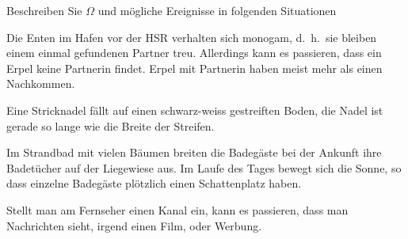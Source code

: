 Beschreiben Sie $\Omega$ und mögliche Ereignisse in folgenden Situationen
\begin{teilaufgaben}
\item
Die Enten im Hafen vor der HSR verhalten sich monogam, d.~h.~sie bleiben einem
einmal gefundenen Partner treu. Allerdings kann es passieren, dass ein
Erpel keine Partnerin findet. Erpel mit Partnerin haben meist mehr
als einen Nachkommen.
\item
Eine Stricknadel fällt auf einen schwarz-weiss gestreiften Boden, die
Nadel ist gerade so lange wie die Breite der Streifen.
\item
Im Strandbad mit vielen Bäumen breiten die Badegäste bei der Ankunft
ihre Badetücher auf der Liegewiese aus.
Im Laufe des Tages bewegt sich die Sonne, so dass
einzelne Badegäste plötzlich einen Schattenplatz haben.
\item
Stellt man am Fernseher einen Kanal ein, kann es passieren, dass
man Nachrichten sieht, irgend einen Film, oder Werbung.
\end{teilaufgaben}



